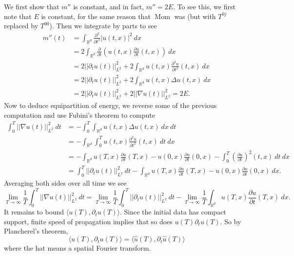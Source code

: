 \documentclass[10pt]{article}
\newcommand{\RR}{\mathbb{R}}
\DeclareMathOperator{\Mom}{Mom}
\theoremstyle{definition}
\begin{document}
We first show that $m''$ is constant, and in fact, $m'' = 2E$.
To see this, we first note that $E$ is constant, for the same reason that $\Mom$ was (but with $T^{0j}$ replaced by $T^{00}$).
Then we integrate by parts to see
\begin{align*}
m''(t) &= \int_{\RR^d} \frac{\partial^2}{\partial t^2} |u(t, x)|^2 ~dx \\
&= 2\int_{\RR^d} \frac{\partial}{\partial t} \left(u(t, x) \frac{\partial u}{\partial t}(t, x) \right) ~dx\\
&= 2||\partial_t u(t)||_{L^2}^2 + 2\int_{\RR^d} u(t, x) \frac{\partial^2 u}{\partial t^2}(t, x) ~dx \\
&= 2||\partial_t u(t)||_{L^2}^2 + 2\int_{\RR^d} u(t, x) \Delta u(t, x) ~dx \\
&= 2||\partial_t u(t)||_{L^2}^2 + 2||\nabla u(t)||_{L^2}^2 = 2E.
\end{align*}
Now to deduce equipartition of energy, we reverse some of the previous computation and use Fubini's theorem to compute
\begin{align*}
\int_0^T ||\nabla u(t)||_{L^2}^2 ~dt &= -\int_0^T \int_{\RR^d} u(t, x) \Delta u(t, x) ~dx ~dt \\
&=  -\int_{\RR^d} \int_0^T u(t, x) \frac{\partial^2 u}{\partial t^2}(t, x) ~dt ~dx\\
&= -\int_{\RR^d} u(T, x)\frac{\partial u}{\partial t}(T, x) - u(0, x)\frac{\partial u}{\partial t}(0, x) - \int_0^T \left(\frac{\partial u}{\partial t}\right)^2(t, x) ~dt ~dx\\
&= \int_0^T ||\partial_t u(t)||_{L^2}^2 ~dt - \int_{\RR^d} u(T, x)\frac{\partial u}{\partial t}(T, x) - u(0, x)\frac{\partial u}{\partial t}(0, x) ~dx.
\end{align*}
Averaging both sides over all time we see
\begin{equation}
\label{almost equipartition}
\lim_{T \to \infty} \frac{1}{T} \int_0^T ||\nabla u(t)||_{L^2}^2 ~dt
= \lim_{T \to \infty} \frac{1}{T} \int_0^T ||\partial_tu(t)||_{L^2}^2 ~dt - \lim_{T \to \infty} \frac{1}{T} \int_{\RR^d} u(T, x) \frac{\partial u}{\partial t}(T,x) ~dx.
\end{equation}
It remains to bound $\langle u(T), \partial_t u(T)\rangle$.
Since the initial data has compact support, finite speed of propagation implies that so does $u(T)\partial_t u(T)$.
So by Plancherel's theorem,
$$\langle u(T), \partial_t u(T)\rangle = \langle \hat u(T), \partial_t \hat u(T)\rangle$$
where the hat means a spatial Fourier transform.
\end{document}
